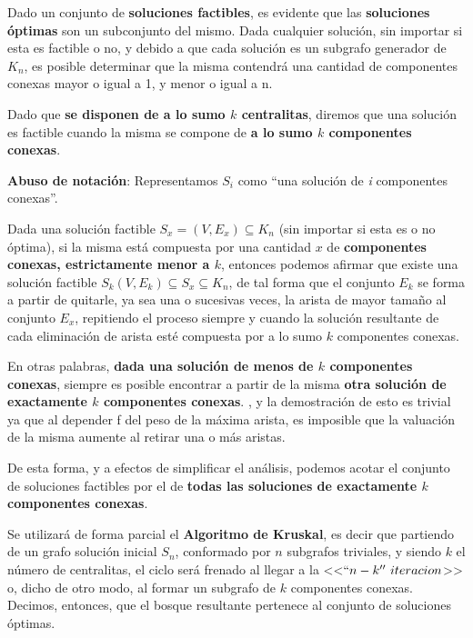 \documentclass[11pt, a4paper, twoside]{article}
\begin{document}

Dado un conjunto de \textbf{soluciones factibles}, es evidente que las \textbf{soluciones óptimas}
son un subconjunto del mismo. Dada cualquier solución, sin importar si esta es factible o no, y
debido a que cada solución es un subgrafo generador de $K_{n}$, es posible determinar que la misma
contendrá una cantidad de componentes conexas mayor o igual a 1, y menor o igual a n.

Dado que \textbf{se disponen de a lo sumo $k$ centralitas}, diremos que una solución es factible
cuando la misma se compone de \textbf{a lo sumo $k$ componentes conexas}.

\textbf{Abuso de notación}: Representamos $S_{i}$ como ``una solución de \emph{i} componentes conexas''.

Dada una solución factible $S_{x} = (V, E_{x}) \subseteq K_{n}$ (sin importar si esta es o no
óptima), si la misma está compuesta por una cantidad $x$ de \textbf{componentes conexas,
estrictamente menor a $k$}, entonces podemos afirmar que existe una solución factible $S_{k} (V,
E_{k}) \subseteq S_{x} \subseteq K_{n}$, de tal forma que el conjunto $E_{k}$ se forma a partir de
quitarle, ya sea una o sucesivas veces, la arista de mayor tamaño al conjunto $E_{x}$, repitiendo el
proceso siempre y cuando la solución resultante de cada eliminación de arista esté compuesta por a
lo sumo $k$ componentes conexas.

En otras palabras, \textbf{dada una solución de menos de $k$ componentes conexas}, siempre es
posible encontrar a partir de la misma \textbf{otra solución de exactamente $k$ componentes
conexas}. , y la demostración de esto
es trivial ya que al depender f del peso de la máxima arista, es imposible que la valuación de la
misma aumente al retirar una o más aristas.

De esta forma, y a efectos de simplificar el análisis, podemos acotar el conjunto de soluciones
factibles por el de \textbf{todas las soluciones de exactamente $k$ componentes conexas}.



Se utilizará de forma parcial el \textbf{Algoritmo de Kruskal}, es decir que partiendo de un grafo solución
inicial $S_{n}$, conformado por $n$ subgrafos triviales, y siendo $k$ el número de centralitas, el
ciclo será frenado al llegar a la <<$``n-k''~iteracion$>> o, dicho de otro modo, al formar un
subgrafo de $k$ componentes conexas. Decimos, entonces, que el bosque resultante pertenece al
conjunto de soluciones óptimas.
\end{document}

